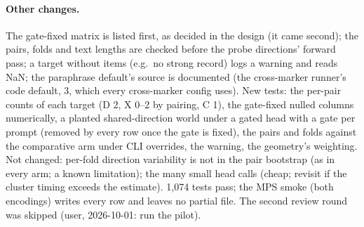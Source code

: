 \documentclass{article}
\begin{document}
\paragraph{Other changes.} The gate-fixed matrix is listed first, as decided in the design (it came second); the
pairs, folds and text lengths are checked before the probe directions' forward pass; a target without items (e.g.\ no
strong record) logs a warning and reads NaN; the paraphrase default's source is documented (the cross-marker runner's
code default, 3, which every cross-marker config uses). New tests: the per-pair counts of each target (D 2, X 0--2 by
pairing, C 1), the gate-fixed nulled columns numerically, a planted shared-direction world under a gated head with a
gate per prompt (removed by every row once the gate is fixed), the pairs and folds against the comparative arm under
CLI overrides, the warning, the geometry's weighting. Not changed: per-fold direction variability is not in the pair
bootstrap (as in every arm; a known limitation); the many small head calls (cheap; revisit if the cluster timing
exceeds the estimate). 1{,}074 tests pass; the MPS smoke (both encodings) writes every row and leaves no partial file.
The second review round was skipped (user, 2026-10-01: run the pilot).
\end{document}
